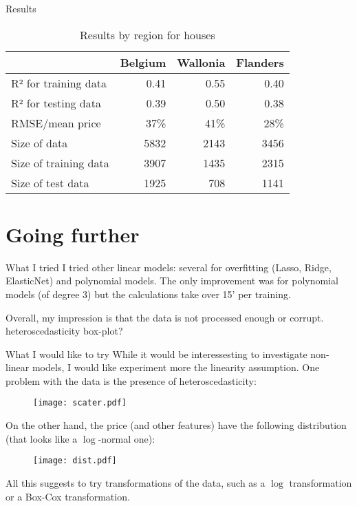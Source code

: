 \documentclass[handout,10pt,hyperref={urlcolor=orange}]{beamer}
\begin{document}
\begin{frame}{Results}
    \begin{table}
    \centering
\begin{tabular}{lrrr}
\toprule
{} &        Belgium &       Wallonia &      Flanders \\
\midrule
R² for training data  &           0.41 &           0.55 &          0.40 \\
R² for testing data   &           0.39 &           0.50 &          0.38 \\
RMSE/mean price  & 37\% & 41\% & 28\% \\
Size of data          &        5832 &        2143 &       3456 \\
Size of training data &        3907 &        1435 &       2315 \\
Size of test data     &        1925 &         708 &       1141 \\
\bottomrule
\end{tabular}
    \caption{Results by region for houses}
  \end{table}


\end{frame}
\section{Going further}
\begin{frame}{What I tried}
  I tried other linear models: several for overfitting (Lasso, Ridge, ElasticNet) and polynomial models. The only improvement was for polynomial models (of degree 3) but the calculations take over 15' per training.

  Overall, my impression is that the data is not processed enough or corrupt.
  heteroscedasticity box-plot?
\end{frame}

\begin{frame}{What I would like to try}
  While it would be interessesting to investigate non-linear models, I would like experiment more the linearity assumption. One problem with the data is the presence of heteroscedasticity:

  \begin{figure}[h]
    \centering
    \texttt{[image: scater.pdf]}
  \end{figure}
\end{frame}
\begin{frame}
  On the other hand, the price (and other features) have the following distribution (that looks like a $\log$-normal one):
  \begin{figure}[h]
    \centering
    \texttt{[image: dist.pdf]}
  \end{figure}
  All this suggests to try transformations of the data, such as a $\log$ transformation or a Box-Cox transformation.
\end{frame}
\end{document}
